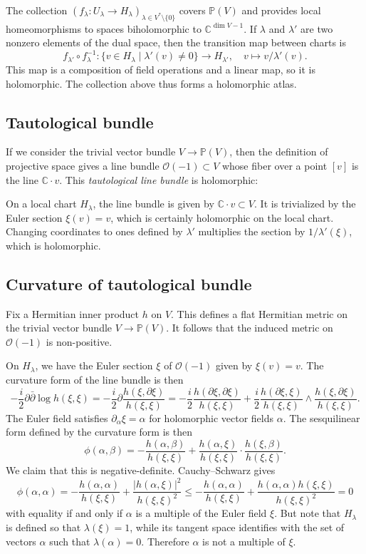 \documentclass[10pt,a4paper]{article}
\newcommand{\kk}[1]{\mathbb{#1}}
\newcommand{\cc}[1]{\mathcal{#1}}
\begin{document}
The collection $(f_\lambda : U_\lambda \to H_\lambda)_{\lambda \in V^* \setminus \{0\}}$ covers $\kk P(V)$ and provides local homeomorphisms to spaces biholomorphic to $\kk C^{\dim V - 1}$. If $\lambda$ and $\lambda'$ are two nonzero elements of the dual space, then the transition map between charts is
$$
f_{\lambda'} \circ f_{\lambda}^{-1} : \{v \in H_\lambda \mid \lambda'(v) \not= 0 \} \to H_{\lambda'},
\quad
v \mapsto v/\lambda'(v).
$$
This map is a composition of field operations and a linear map, so it is holomorphic. The collection above thus forms a holomorphic atlas.


\subsection{Tautological bundle}


If we consider the trivial vector bundle $V \to \kk P(V)$, then the definition of projective space gives a line bundle $\cc O(-1) \subset V$ whose fiber over a point $[v]$ is
the line $\kk C \cdot v$. This \emph{tautological line bundle} is holomorphic:

On a local chart $H_\lambda$, the line bundle is given by $\kk C \cdot v \subset V$. It is trivialized by the Euler section $\xi(v) = v$, which is certainly holomorphic on the local chart. Changing coordinates to ones defined by $\lambda'$ multiplies the section by $1/\lambda'(\xi)$, which is holomorphic.



\subsection{Curvature of tautological bundle}

Fix a Hermitian inner product $h$ on $V$. This defines a flat Hermitian metric on the trivial vector bundle $V \to \kk P(V)$. It follows that the induced metric on $\cc O(-1)$ is non-positive.

On $H_\lambda$, we have the Euler section $\xi$ of $\cc O(-1)$ given by $\xi(v) = v$. The curvature form of the line bundle is then
$$
-\frac i2 \partial \bar\partial \log h(\xi, \xi)
= -\frac i2\partial \frac{h(\xi, \partial \xi)}{h(\xi, \xi)}
= -\frac i2\frac{h(\partial \xi, \partial \xi)}{h(\xi, \xi)}
+ \frac i2\frac{h(\partial \xi, \xi)}{h(\xi, \xi)} \wedge \frac{h(\xi, \partial \xi)}{h(\xi, \xi)}.
$$
The Euler field satisfies $\partial_\alpha \xi = \alpha$ for holomorphic vector fields $\alpha$. The sesquilinear form defined by the curvature form is then
$$
\phi(\alpha, \beta)
= -\frac{h(\alpha, \beta)}{h(\xi, \xi)}
+ \frac{h(\alpha, \xi)}{h(\xi, \xi)} \cdot \frac{h(\xi, \beta)}{h(\xi, \xi)}.
$$
We claim that this is negative-definite. Cauchy--Schwarz gives
$$
\phi(\alpha, \alpha)
= -\frac{h(\alpha, \alpha)}{h(\xi, \xi)}
+ \frac{|h(\alpha, \xi)|^2}{h(\xi, \xi)^2}
\leq -\frac{h(\alpha, \alpha)}{h(\xi, \xi)}
+ \frac{h(\alpha, \alpha) h(\xi, \xi)}{h(\xi, \xi)^2}
= 0
$$
with equality if and only if $\alpha$ is a multiple of the Euler field $\xi$. But note that $H_\lambda$ is defined so that $\lambda(\xi) = 1$, while its tangent space identifies with the set of vectors $\alpha$ such that $\lambda(\alpha) = 0$. Therefore $\alpha$ is not a multiple of $\xi$.
\end{document}
